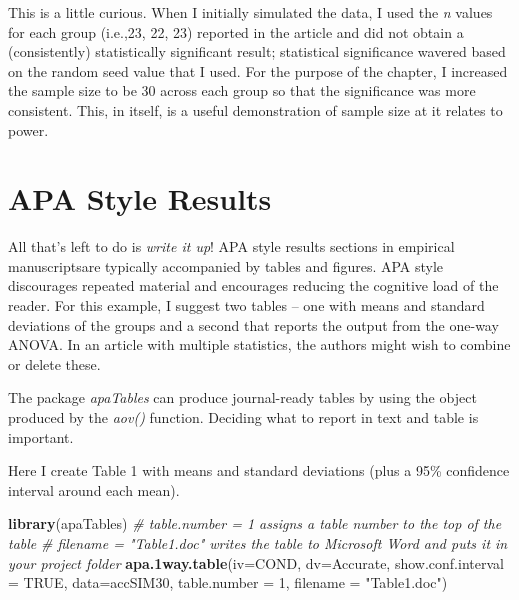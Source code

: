 \documentclass[
  english,
]{book}
\newenvironment{Shaded}{\begin{snugshade}}{\end{snugshade}}
\newcommand{\CommentTok}[1]{\textcolor[rgb]{0.56,0.35,0.01}{\textit{#1}}}
\newcommand{\DataTypeTok}[1]{\textcolor[rgb]{0.13,0.29,0.53}{#1}}
\newcommand{\DecValTok}[1]{\textcolor[rgb]{0.00,0.00,0.81}{#1}}
\newcommand{\KeywordTok}[1]{\textcolor[rgb]{0.13,0.29,0.53}{\textbf{#1}}}
\newcommand{\NormalTok}[1]{#1}
\newcommand{\OtherTok}[1]{\textcolor[rgb]{0.56,0.35,0.01}{#1}}
\newcommand{\StringTok}[1]{\textcolor[rgb]{0.31,0.60,0.02}{#1}}
\begin{document}
This is a little curious. When I initially simulated the data, I used the \emph{n} values for each group (i.e.,23, 22, 23) reported in the article \citep{tran_you_2014} and did not obtain a (consistently) statistically significant result; statistical significance wavered based on the random seed value that I used. For the purpose of the chapter, I increased the sample size to be 30 across each group so that the significance was more consistent. This, in itself, is a useful demonstration of sample size at it relates to power.

\hypertarget{apa-style-results}{%
\section{APA Style Results}\label{apa-style-results}}

All that's left to do is \emph{write it up}! APA style results sections in empirical manuscriptsare typically accompanied by tables and figures. APA style discourages repeated material and encourages reducing the cognitive load of the reader. For this example, I suggest two tables -- one with means and standard deviations of the groups and a second that reports the output from the one-way ANOVA. In an article with multiple statistics, the authors might wish to combine or delete these.

The package \emph{apaTables} can produce journal-ready tables by using the object produced by the \emph{aov()} function. Deciding what to report in text and table is important.

Here I create Table 1 with means and standard deviations (plus a 95\% confidence interval around each mean).

\begin{Shaded}
\begin{Highlighting}[]
\KeywordTok{library}\NormalTok{(apaTables)}
\CommentTok{# table.number = 1 assigns a table number to the top of the table }
\CommentTok{# filename = "Table1.doc" writes the table to Microsoft Word and puts it in your project folder}
\KeywordTok{apa.1way.table}\NormalTok{(}\DataTypeTok{iv=}\NormalTok{COND, }\DataTypeTok{dv=}\NormalTok{Accurate, }\DataTypeTok{show.conf.interval =} \OtherTok{TRUE}\NormalTok{, }\DataTypeTok{data=}\NormalTok{accSIM30, }\DataTypeTok{table.number =} \DecValTok{1}\NormalTok{, }\DataTypeTok{filename =} \StringTok{"Table1.doc"}\NormalTok{)}
\end{Highlighting}
\end{Shaded}
\end{document}

